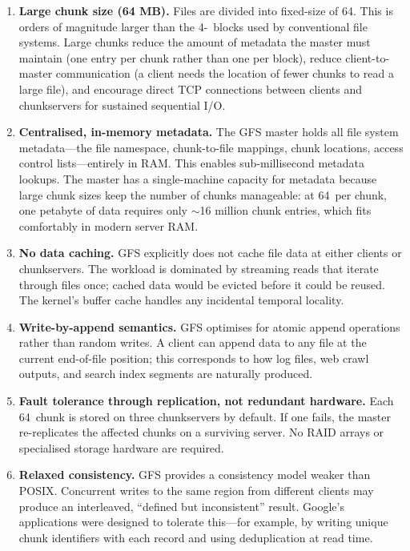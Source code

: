 \begin{enumerate}
  \item \textbf{Large chunk size (64 MB).} Files are divided into
        fixed-size  of 64\MB. This is orders of magnitude
        larger than the 4-\KB\ blocks used by conventional file systems.
        Large chunks reduce the amount of metadata the master must
        maintain (one entry per chunk rather than one per block), reduce
        client-to-master communication (a client needs the location of
        fewer chunks to read a large file), and encourage direct TCP
        connections between clients and chunkservers for sustained
        sequential I/O.

  \item \textbf{Centralised, in-memory metadata.} The GFS master holds
        all file system metadata---the file namespace, chunk-to-file
        mappings, chunk locations, access control lists---entirely in
        RAM. This enables sub-millisecond metadata lookups. The master
        has a single-machine capacity for metadata because large chunk
        sizes keep the number of chunks manageable: at 64\MB\ per chunk,
        one petabyte of data requires only $\sim$16 million chunk
        entries, which fits comfortably in modern server RAM.

  \item \textbf{No data caching.} GFS explicitly does not cache file
        data at either clients or chunkservers. The workload is
        dominated by streaming reads that iterate through files once;
        cached data would be evicted before it could be reused. The
        kernel's buffer cache handles any incidental temporal locality.

  \item \textbf{Write-by-append semantics.} GFS optimises for atomic
        append operations rather than random writes. A client can append
        data to any file at the current end-of-file position; this
        corresponds to how log files, web crawl outputs, and search
        index segments are naturally produced.

  \item \textbf{Fault tolerance through replication, not redundant
        hardware.} Each 64\MB\ chunk is stored on three chunkservers
        by default. If one fails, the master re-replicates the
        affected chunks on a surviving server. No RAID arrays or
        specialised storage hardware are required.

  \item \textbf{Relaxed consistency.} GFS provides a consistency model
        weaker than POSIX. Concurrent writes to the same region from
        different clients may produce an interleaved, ``defined but
        inconsistent'' result. Google's applications were designed to
        tolerate this---for example, by writing unique chunk identifiers
        with each record and using deduplication at read time.
\end{enumerate}

